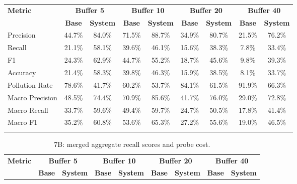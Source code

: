 \documentclass[pdflatex,sn-mathphys-num]{sn-jnl}%
\theoremstyle{thmstyleone}%
\theoremstyle{thmstyletwo}%
\theoremstyle{thmstylethree}%
\begin{document}
\begin{appendices}
\begin{landscape}
\begin{longtable}{@{}p{3.8cm}cccccccc@{}}
\toprule
\textbf{Metric} & \multicolumn{2}{c}{\textbf{Buffer 5}} & \multicolumn{2}{c}{\textbf{Buffer 10}} & \multicolumn{2}{c}{\textbf{Buffer 20}} & \multicolumn{2}{c}{\textbf{Buffer 40}} \\
\cmidrule(lr){2-3}\cmidrule(lr){4-5}\cmidrule(lr){6-7}\cmidrule(lr){8-9}
 & \textbf{Base} & \textbf{System} & \textbf{Base} & \textbf{System} & \textbf{Base} & \textbf{System} & \textbf{Base} & \textbf{System} \\
\midrule
\endhead
Precision & 44.7\% & 84.0\% & 71.5\% & 88.7\% & 34.9\% & 80.7\% & 21.5\% & 76.2\% \\
Recall & 21.1\% & 58.1\% & 39.6\% & 46.1\% & 15.6\% & 38.3\% & 7.8\% & 33.4\% \\
F1 & 24.3\% & 62.9\% & 44.7\% & 55.2\% & 18.7\% & 45.6\% & 9.8\% & 39.3\% \\
Accuracy & 21.4\% & 58.3\% & 39.8\% & 46.3\% & 15.9\% & 38.5\% & 8.1\% & 33.7\% \\
Pollution Rate & 78.6\% & 41.7\% & 60.2\% & 53.7\% & 84.1\% & 61.5\% & 91.9\% & 66.3\% \\
Macro Precision & 48.5\% & 74.4\% & 70.9\% & 85.6\% & 41.7\% & 76.0\% & 29.0\% & 72.8\% \\
Macro Recall & 33.7\% & 59.6\% & 49.4\% & 59.7\% & 24.7\% & 50.5\% & 17.8\% & 41.4\% \\
Macro F1 & 35.2\% & 60.8\% & 53.6\% & 65.3\% & 27.2\% & 55.6\% & 19.0\% & 46.5\% \\
\botrule
\end{longtable}
\normalsize
\end{landscape}
\begin{landscape}
\tiny
\begin{longtable}{@{}p{3.8cm}cccccccc@{}}
\caption{7B: merged aggregate recall scores and probe cost.}\label{tab:app_7b_recall_agg}\\

\toprule
\textbf{Metric} & \multicolumn{2}{c}{\textbf{Buffer 5}} & \multicolumn{2}{c}{\textbf{Buffer 10}} & \multicolumn{2}{c}{\textbf{Buffer 20}} & \multicolumn{2}{c}{\textbf{Buffer 40}} \\
\cmidrule(lr){2-3}\cmidrule(lr){4-5}\cmidrule(lr){6-7}\cmidrule(lr){8-9}
 & \textbf{Base} & \textbf{System} & \textbf{Base} & \textbf{System} & \textbf{Base} & \textbf{System} & \textbf{Base} & \textbf{System} \\
\midrule
\endfirsthead


\end{longtable}
\end{landscape}
\end{appendices}
\end{document}
